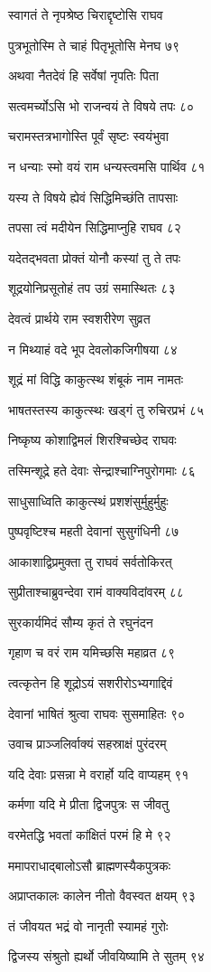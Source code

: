 स्वागतं ते नृपश्रेष्ठ चिराद्दृष्टोसि राघव

पुत्रभूतोस्मि ते चाहं पितृभूतोसि मेनघ ७९

अथवा नैतदेवं हि सर्वेषां नृपतिः पिता

सत्वमर्च्योऽसि भो राजन्वयं ते विषये तपः ८०

चरामस्तत्रभागोस्ति पूर्वं सृष्टः स्वयंभुवा

न धन्याः स्मो वयं राम धन्यस्त्वमसि पार्थिव ८१

यस्य ते विषये ह्येवं सिद्धिमिच्छंति तापसाः

तपसा त्वं मदीयेन सिद्धिमाप्नुहि राघव ८२

यदेतद्भवता प्रोक्तं योनौ कस्यां तु ते तपः

शूद्रयोनिप्रसूतोहं तप उग्रं समास्थितः ८३

देवत्वं प्रार्थये राम स्वशरीरेण सुव्रत

न मिथ्याहं वदे भूप देवलोकजिगीषया ८४

शूद्रं मां विद्धि काकुत्स्थ शंबूकं नाम नामतः

भाषतस्तस्य काकुत्स्थः खड्गं तु रुचिरप्रभं ८५

निष्कृष्य कोशाद्विमलं शिरश्चिच्छेद राघवः

तस्मिन्शूद्रे हते देवाः सेन्द्राश्चाग्निपुरोगमाः ८६

साधुसाध्विति काकुत्स्थं प्रशशंसुर्मुहुर्मुहुः

पुष्पवृष्टिश्च महती देवानां सुसुगंधिनी ८७

आकाशाद्विप्रमुक्ता तु राघवं सर्वतोकिरत्

सुप्रीताश्चाब्रुवन्देवा रामं वाक्यविदांवरम् ८८

सुरकार्यमिदं सौम्य कृतं ते रघुनंदन

गृहाण च वरं राम यमिच्छसि महाव्रत ८९

त्वत्कृतेन हि शूद्रोऽयं सशरीरोऽभ्यगाद्दिवं

देवानां भाषितं श्रुत्वा राघवः सुसमाहितः ९०

उवाच प्राञ्जलिर्वाक्यं सहस्राक्षं पुरंदरम्

यदि देवाः प्रसन्ना मे वरार्हो यदि वाप्यहम् ९१

कर्मणा यदि मे प्रीता द्विजपुत्रः स जीवतु

वरमेतद्धि भवतां कांक्षितं परमं हि मे ९२

ममापराधाद्बालोऽसौ ब्राह्मणस्यैकपुत्रकः

अप्राप्तकालः कालेन नीतो वैवस्वत क्षयम् ९३

तं जीवयत भद्रं वो नानृती स्यामहं गुरोः

द्विजस्य संश्रुतो ह्यर्थो जीवयिष्यामि ते सुतम् ९४

